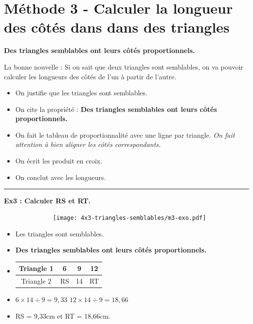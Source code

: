 \documentclass[11pt]{article}
\newcommand{\horrule}[1]{\rule{\linewidth}{#1}} %
\begin{document}
\newpage
\section*{Méthode 3 - Calculer la longueur des côtés dans dans des triangles}

\textbf{Des triangles semblables ont leurs côtés proportionnels.}

La bonne nouvelle : Si on sait que deux triangles sont semblables, on va pouvoir calculer les longueurs des côtés de l'un à partir de l'autre. 

\begin{itemize}
  \item On justifie que les triangles sont semblables.
  \item On cite la propriété : \textbf{Des triangles semblables ont leurs côtés proportionnels.} 
  \item On fait le tableau de proportionnalité avec une ligne par triangle. \textit{On fait attention à bien aligner les côtés correspondants.}
  \item On écrit les produit en croix. 
  \item On conclut avec les longueurs. 
\end{itemize}

\horrule{1px}
\textbf{Ex3 : Calculer RS et RT.}

\begin{multicols}{2}
\begin{figure}[H]
      \centering
      \texttt{[image: 4x3-triangles-semblables/m3-exo.pdf]}
\end{figure}
\columnbreak

\begin{itemize}
  \item Les triangles sont semblables.
  \item \textbf{Des triangles semblables ont leurs côtés proportionnels.} 
  \item     
  \begin{tabular}{|c|c|c|c|}
    \hline
    Triangle 1 & 6 & 9 & 12 \\  \hline
    Triangle 2 & RS & 14 & RT\\  \hline
  \end{tabular}
  \item $6  \times 14 \div 9 = 9,33$ \newline
        $12 \times 14 \div 9 = 18,66$
  \item RS = 9,33cm et RT = 18,66cm.
\end{itemize}

\end{multicols}
\end{document}
